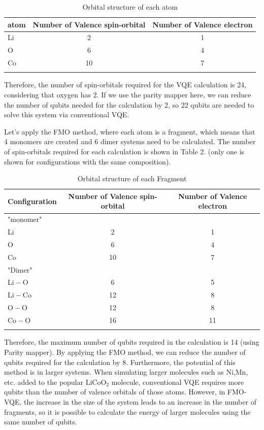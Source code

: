 \documentclass[pdflatex,sn-mathphys-num]{sn-jnl}%
\theoremstyle{thmstyleone}%
\theoremstyle{thmstyletwo}%
\theoremstyle{thmstylethree}%
\begin{document}
\begin{table}[h]
\caption{Orbital structure of each atom}\label{tab1}%
\begin{tabular}{@{}lcc@{}}
\toprule
atom & Number of Valence spin-orbital  & Number of Valence electron\\
\midrule
\(\mathrm{Li}\)   & 2   & 1   \\
\(\mathrm{O}\)   & 6   & 4  \\
\(\mathrm{Co}\)   & 10   & 7   \\
\botrule
\end{tabular}
\end{table}
Therefore, the number of spin-orbitals required for the VQE calculation is 24, considering that oxygen has 2. 
If we use the parity mapper here, we can reduce the number of qubits needed for the calculation by 2,
so 22 qubits are needed to solve this system via conventional VQE. 

Let's apply the FMO method, where each atom is a fragment, which means that 4 monomers are created and 6 dimer systems need to be calculated. 
The number of spin-orbitals required for each calculation is shown in Table 2. (only one is shown for configurations with the same composition).
\begin{table}[h]
\caption{Orbital structure of each Fragment}\label{tab2}%
\begin{tabular}{@{}lcc@{}}
\toprule
Configuration & Number of Valence spin-orbital  & Number of Valence electron\\
\midrule
"monomer"   &   &  \\
\(\mathrm{Li}\)   & 2   & 1   \\
\(\mathrm{O}\)   & 6   & 4  \\
\(\mathrm{Co}\)   & 10   & 7   \\
"Dimer"   &   &  \\
\(\mathrm{Li-O}\)   & 6   & 5   \\
\(\mathrm{Li-Co}\)   & 12   & 8  \\
\(\mathrm{O-O}\)   & 12   & 8   \\
\(\mathrm{Co-O}\)   & 16   & 11   \\
\botrule
\end{tabular}
\end{table}

Therefore, the maximum number of qubits required in the calculation is 14 (using Parity mapper). 
By applying the FMO method, we can reduce the number of qubits required for the calculation by 8. 
Furthermore, the potential of this method is in larger systems. 
When simulating larger molecules such as \(\mathrm{Ni}\),\(\mathrm{Mn}\), etc. 
added to the popular \(\mathrm{LiCoO_2}\) molecule, conventional VQE requires more qubits than the number of valence orbitals of those atoms.
However, in FMO-VQE, the increase in the size of the system leads to an increase in the number of fragments, 
so it is possible to calculate the energy of larger molecules using the same number of qubits.
\end{document}

